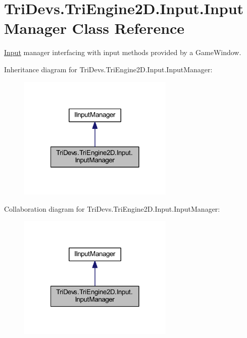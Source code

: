 \hypertarget{class_tri_devs_1_1_tri_engine2_d_1_1_input_1_1_input_manager}{\section{Tri\-Devs.\-Tri\-Engine2\-D.\-Input.\-Input\-Manager Class Reference}
\label{class_tri_devs_1_1_tri_engine2_d_1_1_input_1_1_input_manager}
}


\hyperlink{namespace_tri_devs_1_1_tri_engine2_d_1_1_input}{Input} manager interfacing with input methods provided by a Game\-Window.  




Inheritance diagram for Tri\-Devs.\-Tri\-Engine2\-D.\-Input.\-Input\-Manager\-:\nopagebreak
\begin{figure}[H]
\begin{center}
\leavevmode
\includegraphics[width=210pt]{class_tri_devs_1_1_tri_engine2_d_1_1_input_1_1_input_manager__inherit__graph}
\end{center}
\end{figure}


Collaboration diagram for Tri\-Devs.\-Tri\-Engine2\-D.\-Input.\-Input\-Manager\-:\nopagebreak
\begin{figure}[H]
\begin{center}
\leavevmode
\includegraphics[width=210pt]{class_tri_devs_1_1_tri_engine2_d_1_1_input_1_1_input_manager__coll__graph}
\end{center}
\end{figure}

